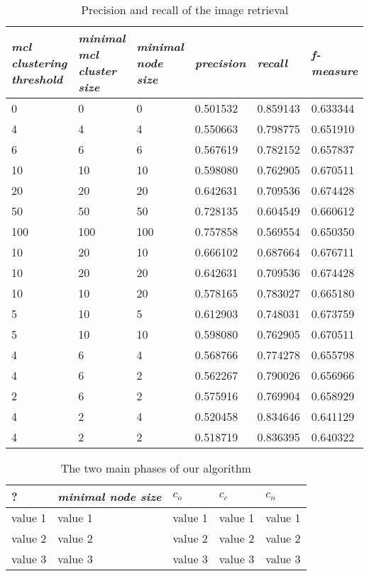 \begin{table}[h]
    \begin{tabular}{| p{2.5cm}| p{2.5cm}| p{2.5cm} || p{1.5cm} | p{1.5cm} | p{1.7cm} |}
    \hline
    \emph{mcl clustering threshold} & \emph{minimal mcl cluster size} & \emph{minimal node size} & \emph{precision} & \emph{recall} & \emph{f-measure} \\ \hline
    0 	& 0 	& 0 & 0.501532 & 0.859143 & 0.633344 \\ \hline
    4 	& 4 	& 4 & 0.550663 & 0.798775 & 0.651910 \\ \hline
    6 	& 6 	& 6 & 0.567619 & 0.782152 & 0.657837 \\ \hline  
    10 	& 10 & 10 & 0.598080 & 0.762905 & 0.670511 \\ \hline
    20 	& 20 & 20 & 0.642631 & 0.709536 & 0.674428 \\ \hline
    50	& 50 & 50 & 0.728135 & 0.604549 & 0.660612 \\ \hline
    100 	& 100 & 100 & 0.757858 & 0.569554 & 0.650350 \\ \hline
  
    10 	& 20 & 10 & 0.666102 & 0.687664 & 0.676711 \\ \hline
    10 	& 20 & 20 & 0.642631 & 0.709536 & 0.674428 \\ \hline
    10 	& 10 & 20 & 0.578165 & 0.783027 & 0.665180 \\ \hline
	5 	& 10 & 5 & 0.612903 & 0.748031 & 0.673759 \\ \hline
   	5 	& 10 & 10 & 0.598080 & 0.762905 & 0.670511 \\ \hline

    4	& 6	& 4	& 0.568766 & 0.774278 & 0.655798 \\ \hline    
    4	& 6	& 2	& 0.562267 & 0.790026 & 0.656966 \\ \hline     
    2	& 6	& 2	& 0.575916 & 0.769904 & 0.658929 \\ \hline    
   
    4	& 2	& 4	& 0.520458 & 0.834646 & 0.641129 \\ \hline	
    4	& 2	& 2	& 0.518719 & 0.836395 & 0.640322 \\ \hline	      
    \end{tabular}
    \caption{Precision and recall of the image retrieval}
	\label{tab_retrievalevaluation}
\end{table}


\begin{table}[h]
    \begin{tabular}{| p{1.8cm} | p{1.8cm} || p{1.5cm} | p{1.5cm} | p{1.5cm} |}
    \hline
    ?	& \emph{minimal node size} & $c_o $ & $c_c$ & $c_n$ \\ \hline
    value 1 		& value 1 	& value 1 	& value 1	& value 1 \\ \hline
    value 2 		& value 2	& value 2 	& value 2	& value 2 \\ \hline
    value 3	 	& value 3	& value 3 	& value 3	& value 3 \\
    \hline
    \end{tabular}
    \caption{The two main phases of our algorithm}
	\label{tab_treeevaluation}
\end{table}

